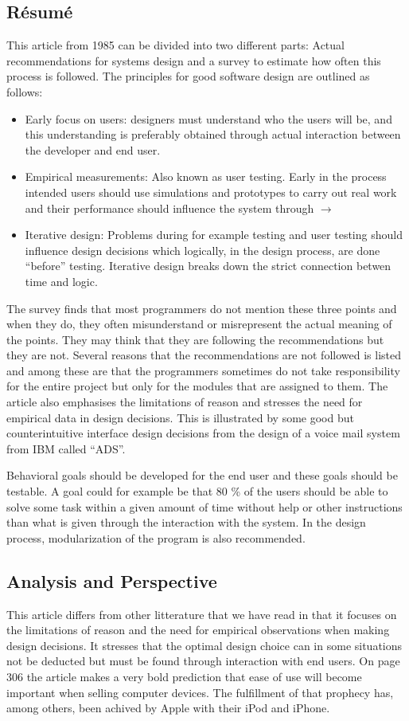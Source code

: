 \documentclass[11pt,a4paper]{report}
\begin{document}
\subsection{Résumé}
This article from 1985 can be divided into two different parts: Actual recommendations for systems design and a survey to estimate how often this process is followed. The principles for good software design are outlined as follows:
\begin{itemize}
\item Early focus on users: designers must understand who the users will be, and this understanding is preferably obtained through actual interaction between the developer and end user.
\item Empirical measurements: Also known as user testing. Early in the process intended users should use simulations and prototypes to carry out real work and their performance should influence the system through $\rightarrow$
\item Iterative design: Problems during for example testing and user testing should influence design decisions which logically, in the design process, are done ``before'' testing. Iterative design breaks down the strict connection betwen time and logic.
\end{itemize}
The survey finds that most programmers do not mention these three points and when they do, they often misunderstand or misrepresent the actual meaning of the points. They may think that they are following the recommendations but they are not. Several reasons that the recommendations are not followed is listed and among these are that the programmers sometimes do not take responsibility for the entire project but only for the modules that are assigned to them. The article also emphasises the limitations of reason and stresses the need for empirical data in design decisions. This is illustrated by some good but counterintuitive interface design decisions from the design of a voice mail system from IBM called ``ADS''.

Behavioral goals should be developed for the end user and these goals should be testable. A goal could for example be that 80 \% of the users should be able to solve some task within a given amount of time without help or other instructions than what is given through the interaction with the system. In the design process, modularization of the program is also recommended.
\subsection{Analysis and Perspective}
This article differs from other litterature that we have read in that it focuses on the limitations of reason and the need for empirical observations when making design decisions. It stresses that the optimal design choice can in some situations not be deducted but must be found through interaction with end users. On page 306 the article makes a very bold prediction that ease of use will become important when selling computer devices. The fulfillment of that prophecy has, among others, been achived by Apple with their iPod and iPhone.
\end{document}
